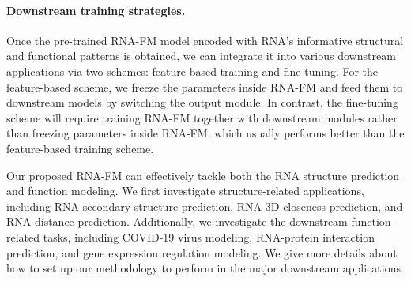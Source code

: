 \paragraph{Downstream training strategies.}
Once the pre-trained RNA-FM model encoded with RNA's informative structural and functional patterns is obtained, we can integrate it into various downstream applications via two schemes: feature-based training and fine-tuning. For the feature-based scheme, we freeze the parameters inside RNA-FM and feed them to downstream models by switching the output module. In contrast, the fine-tuning scheme will require training RNA-FM together with downstream modules rather than freezing parameters inside RNA-FM, which usually performs better than the feature-based training scheme.


Our proposed RNA-FM can effectively tackle both the RNA structure prediction and function modeling. We first investigate structure-related applications, including RNA secondary structure prediction, RNA 3D closeness prediction, and RNA distance prediction. 
Additionally, we investigate the downstream function-related tasks, including COVID-19 virus modeling, RNA-protein interaction prediction, and gene expression regulation modeling. 
We give more details about how to set up our methodology to perform in the major downstream applications.

